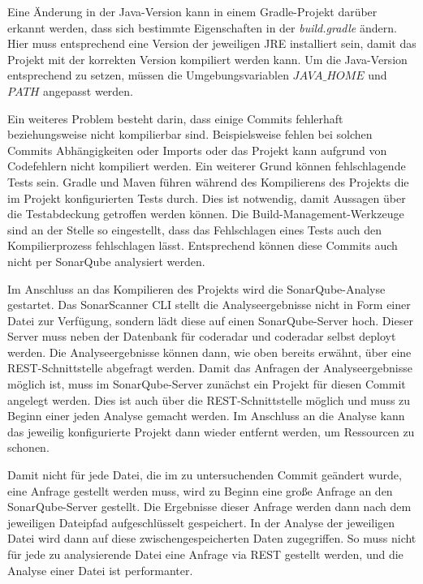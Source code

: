 \documentclass[
	oneside,  %
	ngerman, 
	final, 
	11pt, 
	a4paper, 
	1.1headlines, 
	headinclude=false, 
	footinclude=false, 
	mpinclude=false, 
	pagesize, 
	onecolumn, 
	titlepage, 
	parskip=half, 
	headsepline, 
	chapterprefix=false, 
	version=first, 
	listof=totoc, 
	bibliography=totoc, 
	toc=graduated, 
	fleqn
]{scrbook}
\begin{document}
Eine Änderung in der Java-Version kann in einem Gradle-Projekt darüber erkannt werden, dass sich bestimmte Eigenschaften in der \textit{build.gradle} ändern.
Hier muss entsprechend eine Version der jeweiligen \acs{JRE} installiert sein, damit das Projekt mit der korrekten Version kompiliert werden kann.
Um die Java-Version entsprechend zu setzen, müssen die Umgebungsvariablen \textit{$JAVA\_HOME$} und \textit{$PATH$} angepasst werden.

Ein weiteres Problem besteht darin, dass einige Commits fehlerhaft beziehungsweise nicht kompilierbar sind.
Beispielsweise fehlen bei solchen Commits Abhängigkeiten oder Imports oder das Projekt kann aufgrund von Codefehlern nicht kompiliert werden.
Ein weiterer Grund können fehlschlagende Tests sein.
Gradle und Maven führen während des Kompilierens des Projekts die im Projekt konfigurierten Tests durch.
Dies ist notwendig, damit Aussagen über die Testabdeckung getroffen werden können.
Die Build-Management-Werkzeuge sind an der Stelle so eingestellt, dass das Fehlschlagen eines Tests auch den Kompilierprozess fehlschlagen lässt.
Entsprechend können diese Commits auch nicht per SonarQube analysiert werden.

Im Anschluss an das Kompilieren des Projekts wird die SonarQube-Analyse gestartet.
Das SonarScanner \acs{CLI} stellt die Analyseergebnisse nicht in Form einer Datei zur Verfügung, sondern lädt diese auf einen SonarQube-Server hoch.
Dieser Server muss neben der Datenbank für coderadar und coderadar selbst deployt werden.
Die Analyseergebnisse können dann, wie oben bereits erwähnt, über eine \acs{REST}-Schnittstelle abgefragt werden.
Damit das Anfragen der Analyseergebnisse möglich ist, muss im SonarQube-Server zunächst ein Projekt für diesen Commit angelegt werden.
Dies ist auch über die \acs{REST}-Schnittstelle möglich und muss zu Beginn einer jeden Analyse gemacht werden.
Im Anschluss an die Analyse kann das jeweilig konfigurierte Projekt dann wieder entfernt werden, um Ressourcen zu schonen.

Damit nicht für jede Datei, die im zu untersuchenden Commit geändert wurde, eine Anfrage gestellt werden muss, wird zu Beginn eine große Anfrage an den SonarQube-Server gestellt.
Die Ergebnisse dieser Anfrage werden dann nach dem jeweiligen Dateipfad aufgeschlüsselt gespeichert.
In der Analyse der jeweiligen Datei wird dann auf diese zwischengespeicherten Daten zugegriffen.
So muss nicht für jede zu analysierende Datei eine Anfrage via \acs{REST} gestellt werden, und die Analyse einer Datei ist performanter.
\end{document}
